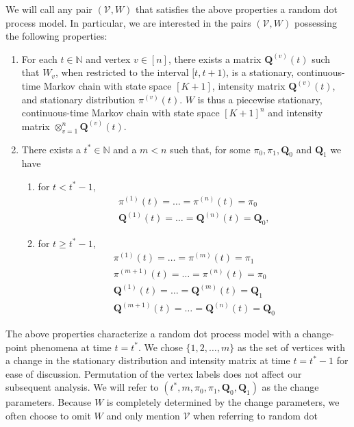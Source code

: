 \documentclass[10pt,journal,compsoc]{IEEEtran}
\theoremstyle{definition}
\begin{document}
We will call any pair $(\mathscr{V}, W)$ that satisfies the above
properties a random dot process model. In particular, we are
interested in the pairs $(\mathscr{V}, W)$ possessing the following
properties:
\begin{enumerate}
\item For each $t \in \mathbb{N}$ and vertex $v \in [n]$, there exists
  a matrix $\mathbf{Q}^{(v)}(t)$ such that $W_v$, when restricted to
  the interval $[t, t+1)$, is a stationary, continuous-time Markov
  chain with state space $[K+1]$, intensity matrix
  ${\mathbf{Q}^{(v)}(t)}$, and stationary distribution
  $\pi^{(v)}(t)$. $W$ is thus a piecewise stationary, continuous-time
  Markov chain with state space $[K+1]^{n}$ and intensity matrix
  $\otimes_{v=1}^{n}\mathbf{Q}^{(v)}(t)$.
\item There exists a $t^{*} \in \mathbb{N}$ and a $m < n$ such that,
  for some $\pi_0, \pi_1, \mathbf{Q}_0$ and $\mathbf{Q}_1$ we have
  \begin{enumerate}
  \item for $t < t^{*} - 1$,
    \begin{gather*}
      \pi^{(1)}(t) = \dots = \pi^{(n)}(t) = \pi_0 \\
      \mathbf{Q}^{(1)}(t) = \dots = \mathbf{Q}^{(n)}(t) = \mathbf{Q}_0,
    \end{gather*}
  \item  for $t \geq t^{*} - 1$,
    \begin{gather*}
      \pi^{(1)}(t) = \dots = \pi^{(m)}(t) = \pi_1 \\
      \pi^{(m+1)}(t)  = \dots = \pi^{(n)}(t) = \pi_0 \\
      \mathbf{Q}^{(1)}(t)  = \dots = \mathbf{Q}^{(m)}(t) = \mathbf{Q}_1 \\
      \mathbf{Q}^{(m+1)}(t) = \dots = \mathbf{Q}^{(n)}(t) = \mathbf{Q}_0 
    \end{gather*}
  \end{enumerate}
\end{enumerate}
The above properties characterize a random dot process model with a
change-point phenomena at time $t = t^{*}$. We chose $\{1,2,\dots,m\}$
as the set of vertices with a change in the stationary distribution
and intensity matrix at time $t = t^{*} - 1$ for ease of
discussion. Permutation of the vertex labels does not affect our
subsequent analysis. We will refer to $(t^{*}, m, \pi_0, \pi_1,
\mathbf{Q}_0, \mathbf{Q}_1)$ as the change parameters.  Because $W$ is
completely determined by the change parameters, we often choose to
omit $W$ and only mention $\mathscr{V}$ when referring to random dot
\end{document}
